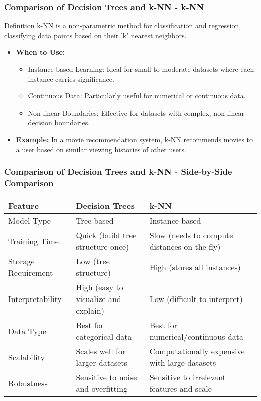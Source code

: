 \documentclass[aspectratio=169]{beamer}
\begin{document}
\begin{frame}[fragile]
    \frametitle{Comparison of Decision Trees and k-NN - k-NN}
    \begin{block}{Definition}
        k-NN is a non-parametric method for classification and regression, classifying data points based on their 'k' nearest neighbors.
    \end{block}
    
    \begin{itemize}
        \item \textbf{When to Use:}
            \begin{itemize}
                \item Instance-based Learning: Ideal for small to moderate datasets where each instance carries significance.
                \item Continuous Data: Particularly useful for numerical or continuous data.
                \item Non-linear Boundaries: Effective for datasets with complex, non-linear decision boundaries.
            \end{itemize}
        \item \textbf{Example:} In a movie recommendation system, k-NN recommends movies to a user based on similar viewing histories of other users.
    \end{itemize}
\end{frame}

\begin{frame}[fragile]
    \frametitle{Comparison of Decision Trees and k-NN - Side-by-Side Comparison}
    \begin{tabular}{|l|l|l|}
        \hline
        \textbf{Feature} & \textbf{Decision Trees} & \textbf{k-NN} \\ \hline
        Model Type & Tree-based & Instance-based \\ \hline
        Training Time & Quick (build tree structure once) & Slow (needs to compute distances on the fly) \\ \hline
        Storage Requirement & Low (tree structure) & High (stores all instances) \\ \hline
        Interpretability & High (easy to visualize and explain) & Low (difficult to interpret) \\ \hline
        Data Type & Best for categorical data & Best for numerical/continuous data \\ \hline
        Scalability & Scales well for larger datasets & Computationally expensive with large datasets \\ \hline
        Robustness & Sensitive to noise and overfitting & Sensitive to irrelevant features and scale \\ \hline
    \end{tabular}
\end{frame}
\end{document}
